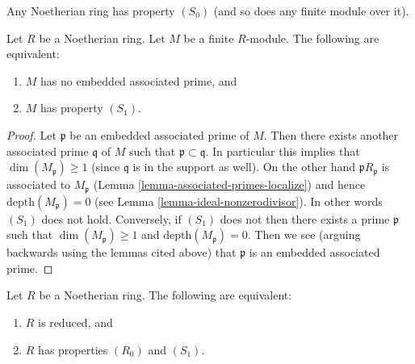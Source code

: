 \noindent
Any Noetherian ring has property $(S_0)$ (and so does any finite module
over it).

\begin{lemma}
\label{lemma-criterion-no-embedded-primes}
Let $R$ be a Noetherian ring.
Let $M$ be a finite $R$-module.
The following are equivalent:
\begin{enumerate}
\item $M$ has no embedded associated prime, and
\item $M$ has property $(S_1)$.
\end{enumerate}
\end{lemma}

\begin{proof}
Let $\mathfrak p$ be an embedded associated prime of $M$.
Then there exists another associated prime $\mathfrak q$ of $M$
such that $\mathfrak p \subset \mathfrak q$. In particular this
implies that $\dim(M_{\mathfrak p}) \geq 1$ (since $\mathfrak q$
is in the support as well). On the other hand $\mathfrak pR_{\mathfrak p}$
is associated to $M_{\mathfrak p}$
(Lemma \ref{lemma-associated-primes-localize}) and hence
$\text{depth}(M_{\mathfrak p}) = 0$
(see Lemma \ref{lemma-ideal-nonzerodivisor}).
In other words $(S_1)$ does not hold.
Conversely, if $(S_1)$ does not then there exists a prime
$\mathfrak p$ such that $\dim(M_{\mathfrak p}) \geq 1$
and $\text{depth}(M_{\mathfrak p}) = 0$. Then we see
(arguing backwards using the lemmas cited above) that $\mathfrak p$
is an embedded associated prime.
\end{proof}

\begin{lemma}
\label{lemma-criterion-reduced}
Let $R$ be a Noetherian ring.
The following are equivalent:
\begin{enumerate}
\item $R$ is reduced, and
\item $R$ has properties $(R_0)$ and $(S_1)$.
\end{enumerate}
\end{lemma}

